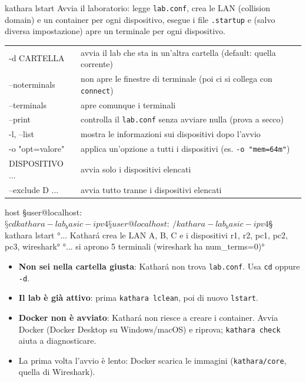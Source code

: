 \begin{scheda}{kathara lstart}
Avvia il laboratorio: legge \texttt{lab.conf}, crea le LAN (collision domain) e un container per ogni dispositivo, esegue i file \texttt{.startup} e (salvo diversa impostazione) apre un terminale per ogni dispositivo.
\begin{tabularx}{\linewidth}{>{\ttfamily\small}l Y}
-d CARTELLA & avvia il lab che sta in un'altra cartella (default: quella corrente)\\
--noterminals & non apre le finestre di terminale (poi ci si collega con \texttt{connect})\\
--terminals & apre comunque i terminali\\
--print & controlla il \texttt{lab.conf} senza avviare nulla (prova a secco)\\
-l, --list & mostra le informazioni sui dispositivi dopo l'avvio\\
-o "opt=valore" & applica un'opzione a tutti i dispositivi (es. \texttt{-o "mem=64m"})\\
DISPOSITIVO ... & avvia solo i dispositivi elencati\\
--exclude D ... & avvia tutto tranne i dispositivi elencati\\
\end{tabularx}
\begin{terminale}{host}
§user@localhost:~$§ cd kathara-lab_basic-ipv4
§user@localhost:~/kathara-lab_basic-ipv4$§ kathara lstart
°... Kathará crea le LAN A, B, C e i dispositivi r1, r2, pc1, pc2, pc3, wireshark°
°... si aprono 5 terminali (wireshark ha num_terms=0)°
\end{terminale}
\end{scheda}
\begin{attenzione}
\begin{itemize}
  \item \textbf{Non sei nella cartella giusta}: Kathará non trova \texttt{lab.conf}. Usa \texttt{cd} oppure \texttt{-d}.
  \item \textbf{Il lab è già attivo}: prima \texttt{kathara lclean}, poi di nuovo \texttt{lstart}.
  \item \textbf{Docker non è avviato}: Kathará non riesce a creare i container. Avvia Docker (Docker Desktop su Windows/macOS) e riprova; \texttt{kathara check} aiuta a diagnosticare.
  \item La prima volta l'avvio è lento: Docker scarica le immagini (\texttt{kathara/core}, quella di Wireshark).
\end{itemize}
\end{attenzione}

